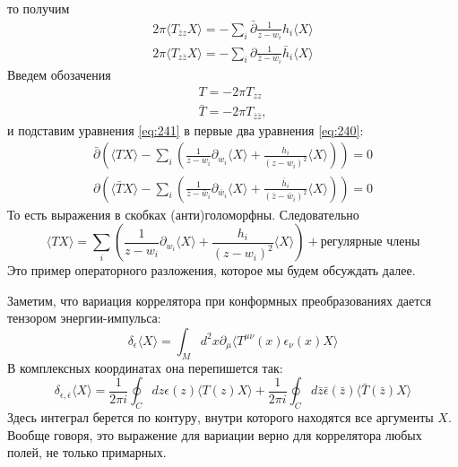 \documentclass[a4paper,12pt]{article} \usepackage[utf8x]{inputenc} \usepackage[russian]{babel}
\theoremstyle{definition} \newtheorem{corollary}{Corollary}[theorem] \theoremstyle{definition}
\begin{document}
то получим
\begin{eqnarray}
  \label{eq:241} 2\pi \langle T_{\bar z z} X\rangle = -\sum_{i} \bar \partial \frac{1}{z-w_{i}}
h_{i} \langle X\rangle\\ 2\pi \langle T_{z \bar z} X\rangle = -\sum_{i} \partial \frac{1}{\bar
z-\bar w_{i}} \bar h_{i} \langle X\rangle
\end{eqnarray} Введем обозачения
\begin{eqnarray}
  \label{eq:242} T=-2\pi T_{zz}\\ \bar T = -2 \pi T_{\bar z \bar z},
\end{eqnarray} и подставим уравнения \eqref{eq:241} в первые два уравнения \eqref{eq:240}:
\begin{eqnarray}
  \label{eq:243} \bar \partial \left( \langle T X\rangle -\sum_{i} \left(
\frac{1}{z-w_{i}} \partial_{w_{i}} \langle X\rangle + \frac{h_{i}}{(z-w_{i})^{2}} \langle X\rangle
\right) \right) =0\\
  \partial \left( \langle \bar T X\rangle -\sum_{i} \left( \frac{1}{\bar z-\bar
w_{i}} \partial_{\bar w_{i}} \langle X\rangle + \frac{\bar h_{i}}{(\bar z-\bar w_{i})^{2}} \langle
X\rangle \right) \right) =0
\end{eqnarray} То есть выражения в скобках (анти)голоморфны. Следовательно
\begin{equation}
  \label{eq:244} \langle T X\rangle =\sum_{i} \left( \frac{1}{z-w_{i}} \partial_{w_{i}} \langle
X\rangle + \frac{h_{i}}{(z-w_{i})^{2}} \langle X\rangle \right) +\mbox{регулярные члены}
\end{equation} Это пример операторного разложения, которое мы будем обсуждать далее.

Заметим, что вариация коррелятора при конформных преобразованиях дается тензором энергии-импульса:
\begin{equation}
  \label{eq:245} \delta_{\epsilon}\langle X\rangle =\int_{M} d^{2}x \partial_{\mu} \langle
T^{\mu\nu}(x)\epsilon_{\nu}(x) X \rangle
\end{equation} В комплексных координатах она перепишется так:
\begin{equation}
  \label{eq:246} \delta_{\epsilon,\bar \epsilon} \langle X\rangle = \frac{1}{2\pi i} \oint_{C} dz
\epsilon(z) \langle T(z) X\rangle +\frac{1}{2\pi i} \oint_{C} d\bar z \bar \epsilon(\bar z) \langle
\bar T(\bar z) X\rangle
\end{equation} Здесь интеграл берется по контуру, внутри которого находятся все аргументы $X$.
Вообще говоря, это выражение для вариации верно для коррелятора любых полей, не только примарных.
\end{document}
